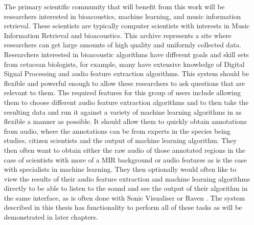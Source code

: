 The primary scientific community that will benefit from this work will
be researchers interested in bioacoustics, machine learning, and music
information retrieval.  These scientists are typically computer
scientists with interests in Music Information Retrieval and
bioacoustics.  This archive represents a site where researchers can
get large amounts of high quality and uniformly collected data.
Researchers interested in bioacoustic algorithms have different goals
and skill sets from cetacean biologists, for example, many have
extensive knowledge of Digital Signal Processing and audio feature
extraction algorithms.  This system should be flexible and powerful
enough to allow these researchers to ask questions that are relevant
to them.  The required features for this group of users include
allowing them to choose different audio feature extraction algorithms
and to then take the resulting data and run it against a variety of
machine learning algorithms in as flexible a manner as possible.  It
should allow them to quickly obtain annotations from audio, where the
annotations can be from experts in the species being studies, citizen
scientists and the output of machine learning algorithm.  They then
often want to obtain either the raw audio of those annotated regions
in the case of scientists with more of a MIR background or audio
features as is the case with specialists in machine learning.  They
then optionally would often like to view the results of their audio
feature extraction and machine learning algorithms directly to be able
to listen to the sound and see the output of their algorithm in the
same interface, as is often done with Sonic Visualiser
\cite{cannam2010sonic} or Raven \cite{ravenpro}.  The system described
in this thesis has functionality to perform all of these tasks as will
be demonstrated in later chapters.

